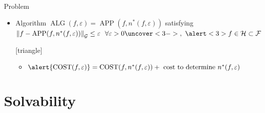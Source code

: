 \documentclass[10pt,compress,xcolor={usenames,dvipsnames},aspectratio=169]{beamer}
\DeclareMathOperator{\app}{APP}
\DeclareMathOperator{\alg}{ALG}
\DeclareMathOperator{\COST}{COST}
\begin{document}
\begin{frame}{Problem}
\begin{itemize}[]
	\item<2-> Algorithm $\alg(f,\varepsilon) = \app(f,n^*(f,\varepsilon))$ satisfying  
	$\norm[\cg]{f -  \app(f,n^*(f,\varepsilon))} \le \varepsilon \ \  \forall \varepsilon > 0 \uncover<3->{,\ \alert<3>{f \in \ch \subset \cf}}$
	
	[triangle]
		\begin{itemize}
	    \item $ \alert{\COST(f,\varepsilon)} = \COST(f,n^*(f,\varepsilon)) + \text{ cost to determine } n^*(f,\varepsilon)$
	\end{itemize}


\end{itemize}

\end{frame}

\section{Solvability}
\end{document}
